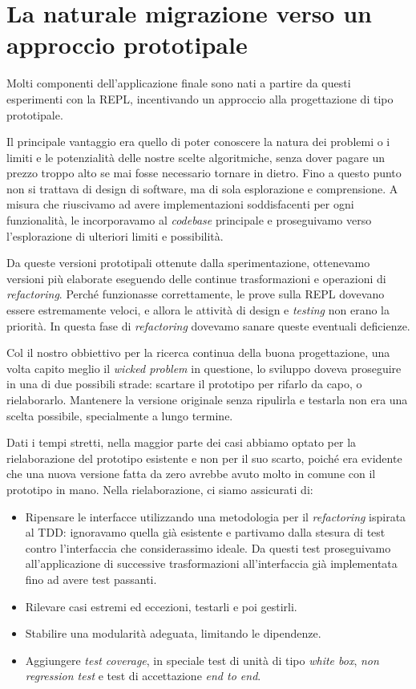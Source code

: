 \documentclass[12pt]{report}
\begin{document}
\section{La naturale migrazione verso un approccio prototipale}

Molti componenti dell'applicazione finale sono nati a partire da questi esperimenti con la REPL, incentivando un approccio alla progettazione di tipo prototipale. 

Il principale vantaggio era quello di poter conoscere la natura dei problemi o i limiti e le potenzialità delle nostre scelte algoritmiche, senza dover pagare un prezzo troppo alto se mai fosse necessario tornare in dietro. Fino a questo punto non si trattava di design di software, ma di sola esplorazione e comprensione. A misura che riuscivamo ad avere implementazioni soddisfacenti per ogni funzionalità, le incorporavamo al \textit{codebase} principale e proseguivamo verso l'esplorazione di ulteriori limiti e possibilità.

Da queste versioni prototipali ottenute dalla sperimentazione, ottenevamo versioni più elaborate eseguendo delle continue trasformazioni e operazioni di \textit{refactoring}. Perché funzionasse correttamente, le prove sulla REPL dovevano essere estremamente veloci, e allora le attività di design e \textit{testing} non erano la priorità. In questa fase di \textit{refactoring} dovevamo sanare queste eventuali deficienze.

Col il nostro obbiettivo per la ricerca continua della buona progettazione, una volta capito meglio il \textit{wicked problem} in questione, lo sviluppo doveva proseguire in una di due possibili strade: scartare il prototipo per rifarlo da capo, o rielaborarlo. Mantenere la versione originale senza ripulirla e testarla non era una scelta possibile, specialmente a lungo termine. 

Dati i tempi stretti, nella maggior parte dei casi abbiamo optato per la rielaborazione del prototipo esistente e non per il suo scarto, poiché era evidente che una nuova versione fatta da zero avrebbe avuto molto in comune con il prototipo in mano. Nella rielaborazione, ci siamo assicurati di:

\begin{itemize}
	\item Ripensare le interfacce utilizzando una metodologia per il \textit{refactoring} ispirata al TDD: ignoravamo quella già esistente e partivamo dalla stesura di test contro l'interfaccia che considerassimo ideale. Da questi test proseguivamo all'applicazione di successive trasformazioni all'interfaccia già implementata fino ad avere test passanti. 
	\item Rilevare casi estremi ed eccezioni, testarli e poi gestirli.
	\item Stabilire una modularità adeguata, limitando le dipendenze.
	\item Aggiungere \textit{test coverage}, in speciale test di unità di tipo \textit{white box}, \textit{non regression test} e test di accettazione \textit{end to end}.
\end{itemize}
\end{document}
